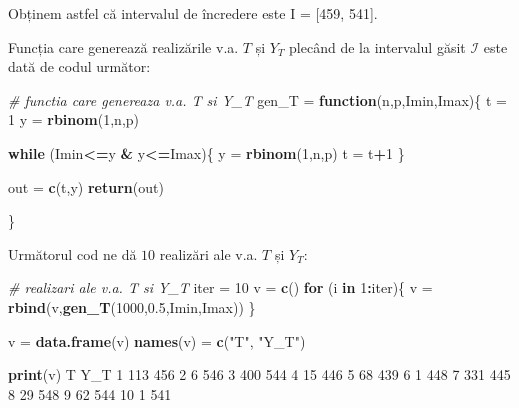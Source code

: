 \documentclass[]{article}
\newenvironment{Shaded}{\begin{snugshade}}{\end{snugshade}}
\newcommand{\CommentTok}[1]{\textcolor[rgb]{0.56,0.35,0.01}{\textit{#1}}}
\newcommand{\ControlFlowTok}[1]{\textcolor[rgb]{0.13,0.29,0.53}{\textbf{#1}}}
\newcommand{\DecValTok}[1]{\textcolor[rgb]{0.00,0.00,0.81}{#1}}
\newcommand{\FloatTok}[1]{\textcolor[rgb]{0.00,0.00,0.81}{#1}}
\newcommand{\KeywordTok}[1]{\textcolor[rgb]{0.13,0.29,0.53}{\textbf{#1}}}
\newcommand{\NormalTok}[1]{#1}
\newcommand{\OperatorTok}[1]{\textcolor[rgb]{0.81,0.36,0.00}{\textbf{#1}}}
\newcommand{\StringTok}[1]{\textcolor[rgb]{0.31,0.60,0.02}{#1}}
\begin{document}
Obținem astfel că intervalul de încredere este I = {[}459, 541{]}.

Funcția care generează realizările v.a. \(T\) și \(Y_T\) plecând de la
intervalul găsit \(\mathcal{I}\) este dată de codul următor:

\begin{Shaded}
\begin{Highlighting}[]
\CommentTok{# functia care genereaza v.a. T si Y_T}
\NormalTok{gen_T =}\StringTok{ }\ControlFlowTok{function}\NormalTok{(n,p,Imin,Imax)\{}
\NormalTok{  t =}\StringTok{ }\DecValTok{1}
\NormalTok{  y =}\StringTok{ }\KeywordTok{rbinom}\NormalTok{(}\DecValTok{1}\NormalTok{,n,p)}
  
  \ControlFlowTok{while}\NormalTok{ (Imin}\OperatorTok{<=}\NormalTok{y }\OperatorTok{&}\StringTok{ }\NormalTok{y}\OperatorTok{<=}\NormalTok{Imax)\{}
\NormalTok{    y =}\StringTok{ }\KeywordTok{rbinom}\NormalTok{(}\DecValTok{1}\NormalTok{,n,p)}
\NormalTok{    t =}\StringTok{ }\NormalTok{t}\OperatorTok{+}\DecValTok{1}
\NormalTok{  \}}
  
\NormalTok{  out =}\StringTok{ }\KeywordTok{c}\NormalTok{(t,y)}
  \KeywordTok{return}\NormalTok{(out)}
  
\NormalTok{\}}
\end{Highlighting}
\end{Shaded}

Următorul cod ne dă \(10\) realizări ale v.a. \(T\) și \(Y_T\):

\begin{Shaded}
\begin{Highlighting}[]
\CommentTok{# realizari ale v.a. T si Y_T}
\NormalTok{iter =}\StringTok{ }\DecValTok{10}
\NormalTok{v =}\StringTok{ }\KeywordTok{c}\NormalTok{()}
\ControlFlowTok{for}\NormalTok{ (i }\ControlFlowTok{in} \DecValTok{1}\OperatorTok{:}\NormalTok{iter)\{}
\NormalTok{  v =}\StringTok{ }\KeywordTok{rbind}\NormalTok{(v,}\KeywordTok{gen_T}\NormalTok{(}\DecValTok{1000}\NormalTok{,}\FloatTok{0.5}\NormalTok{,Imin,Imax))}
\NormalTok{\}}

\NormalTok{v =}\StringTok{ }\KeywordTok{data.frame}\NormalTok{(v)}
\KeywordTok{names}\NormalTok{(v) =}\StringTok{ }\KeywordTok{c}\NormalTok{(}\StringTok{"T"}\NormalTok{, }\StringTok{"Y_T"}\NormalTok{)}

\KeywordTok{print}\NormalTok{(v)}
\NormalTok{     T Y_T}
\DecValTok{1}  \DecValTok{113} \DecValTok{456}
\DecValTok{2}    \DecValTok{6} \DecValTok{546}
\DecValTok{3}  \DecValTok{400} \DecValTok{544}
\DecValTok{4}   \DecValTok{15} \DecValTok{446}
\DecValTok{5}   \DecValTok{68} \DecValTok{439}
\DecValTok{6}    \DecValTok{1} \DecValTok{448}
\DecValTok{7}  \DecValTok{331} \DecValTok{445}
\DecValTok{8}   \DecValTok{29} \DecValTok{548}
\DecValTok{9}   \DecValTok{62} \DecValTok{544}
\DecValTok{10}   \DecValTok{1} \DecValTok{541}
\end{Highlighting}
\end{Shaded}
\end{document}
